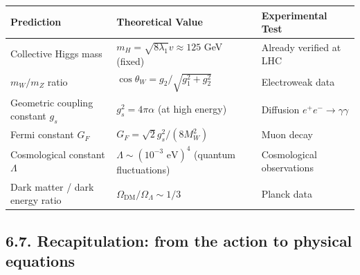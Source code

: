 \documentclass[11pt]{article}
\begin{document}
\begin{table}[H]
\centering
\begin{tabular}{@{}lll@{}}
\toprule
Prediction & Theoretical Value & Experimental Test \\ \midrule
Collective Higgs mass & $m_H = \sqrt{8\lambda_1} v \approx 125$ GeV (fixed) & Already verified at LHC \\
$m_W/m_Z$ ratio & $\cos\theta_W = g_2/\sqrt{g_1^2+g_2^2}$ & Electroweak data \\
Geometric coupling constant $g_s$ & $g_s^2 = 4\pi\alpha$ (at high energy) & Diffusion $e^+e^- \to \gamma\gamma$ \\
Fermi constant $G_F$ & $G_F = \sqrt{2}g_s^2/(8M_W^2)$ & Muon decay \\
Cosmological constant $\Lambda$ & $\Lambda \sim (10^{-3} \text{ eV})^4$ (quantum fluctuations) & Cosmological observations \\
Dark matter / dark energy ratio & $\Omega_{\text{DM}}/\Omega_{\Lambda} \sim 1/3$ & Planck data \\ \bottomrule
\end{tabular}
\end{table}

\hypertarget{recapitulation-from-the-action-to-physical-equations}{%
\subsection{6.7. Recapitulation: from the action to physical
equations}\label{recapitulation-from-the-action-to-physical-equations}}
\end{document}
